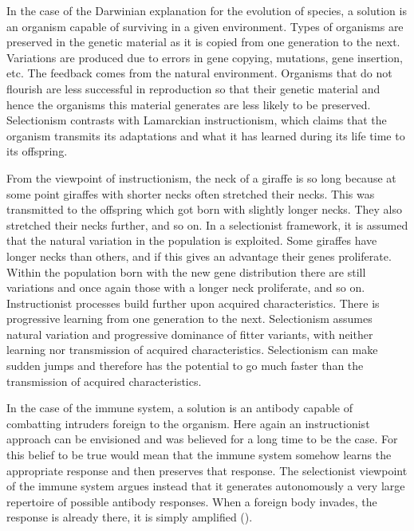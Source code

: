 In the case of the Darwinian explanation for the 
evolution of species, a solution is an organism 
capable of surviving in a given environment. Types 
of organisms are preserved in the genetic material as 
it is copied from one generation to the next. 
Variations are produced due to errors in gene copying, 
mutations, gene insertion, etc. The feedback comes
from the natural environment. Organisms that do not flourish are
less successful in reproduction so that their
genetic material and hence the organisms 
this material generates are less likely to be preserved. 
Selectionism contrasts with Lamarckian instructionism, which 
claims that the organism transmits its adaptations 
and what it has learned during its life time to \enlargethispage{1\baselineskip}
its offspring. 

From the viewpoint of instructionism, the
neck of a giraffe is so long because at some point
giraffes with shorter necks often stretched
their necks. This was transmitted
to the offspring which got born with slightly longer necks.
They also stretched their necks further, 
and so on. In a selectionist framework, it is assumed
that the natural variation in the population 
is exploited. Some giraffes have longer necks than 
others, and if this gives an advantage 
their genes proliferate. Within the population born with the 
new gene distribution there are still variations and 
once again those with a longer neck proliferate, and so on. 
Instructionist processes build further upon acquired characteristics. 
There is progressive learning from one 
generation to the next. Selectionism assumes natural 
variation and progressive dominance of fitter variants, with 
neither learning nor transmission of acquired characteristics. 
Selectionism can make sudden jumps and therefore has the 
potential to go much faster than the transmission of acquired
characteristics. 

In the case of the immune system, a solution is an 
antibody capable of combatting intruders foreign to the 
organism. Here again an instructionist approach can 
be envisioned and was believed for a long time to be 
the case. For this belief to be true would mean that
the immune system somehow learns the appropriate response
and then preserves that response. The selectionist viewpoint
of the immune system argues instead that it
generates autonomously 
a very large repertoire of possible antibody responses. 
When a foreign body invades, the response 
is already 
there, it is simply amplified (\citealt{Varela:1988}). 

